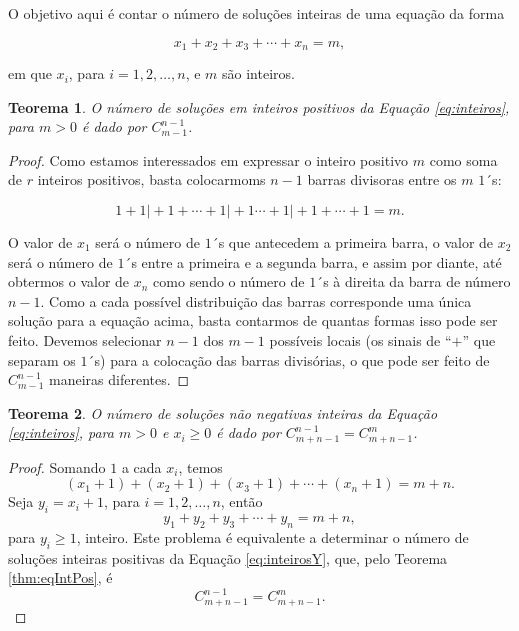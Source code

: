 \documentclass[]{book}
\newtheorem{theorem}{Teorema}[chapter]
\theoremstyle{definition}
\theoremstyle{definition}
\theoremstyle{definition}
\theoremstyle{remark}
\begin{document}
O objetivo aqui é contar o número de soluções inteiras de uma equação da forma

\begin{equation}
x_1 + x_2 + x_3 + \cdots + x_n = m,
\label{eq:inteiros}
\end{equation}

em que \(x_i\), para \(i=1,2,\ldots, n\), e \(m\) são inteiros.

\begin{theorem}
\protect\hypertarget{thm:eqIntPos}{}{\label{thm:eqIntPos} }O número de soluções em inteiros positivos da Equação \eqref{eq:inteiros}, para \(m>0\) é dado por \(C^{n-1}_{m-1}\).
\end{theorem}

\begin{proof}
\iffalse{} {Prova. } \fi{}Como estamos interessados em expressar o inteiro positivo \(m\) como soma de \(r\) inteiros positivos, basta colocarmoms \(n-1\) barras divisoras entre os \(m\) \(1\)´s:

\[1 + 1 \vert + 1 + \cdots +1 \vert  +1 \cdots  + 1 \vert + 1 + \cdots + 1 =m.\]

O valor de \(x_1\) será o número de \(1\)´s que antecedem a primeira barra, o valor de \(x_2\) será o número de \(1\)´s entre a primeira e a segunda barra, e assim por diante, até obtermos o valor de \(x_n\) como sendo o número de \(1\)´s à direita da barra de número \(n-1\).
Como a cada possível distribuição das barras corresponde uma única solução para a equação acima, basta contarmos de quantas formas isso pode ser feito.
Devemos selecionar \(n-1\) dos \(m-1\) possíveis locais (os sinais de ``\(+\)'' que separam os \(1\)´s) para a colocação das barras divisórias, o que pode ser feito de \(C^{n-1}_{m-1}\) maneiras diferentes.
\end{proof}

\begin{theorem}
\protect\hypertarget{thm:solNaoNegInt}{}{\label{thm:solNaoNegInt} }O número de soluções não negativas inteiras da Equação \eqref{eq:inteiros}, para \(m>0\) e \(x_i\geq 0\) é dado por \(C^{n-1}_{m+n-1} = C^{m}_{m+n-1}\).
\end{theorem}

\begin{proof}
\iffalse{} {Prova. } \fi{}Somando \(1\) a cada \(x_i\), temos
\[(x_1+1) + (x_2+1) + (x_3+1) + \cdots + (x_n+1) = m+n.\]
Seja \(y_i = x_i+1\), para \(i=1,2,\ldots,n\), então
\begin{equation}
y_1 + y_2 + y_3 + \cdots + y_n = m+n,
\label{eq:inteirosY}
\end{equation}
para \(y_i \geq 1\), inteiro.
Este problema é equivalente a determinar o número de soluções inteiras positivas da Equação \eqref{eq:inteirosY}, que, pelo Teorema \ref{thm:eqIntPos}, é
\[C^{n-1}_{m+n-1} = C^{m}_{m+n-1}.\]
\end{proof}
\end{document}
